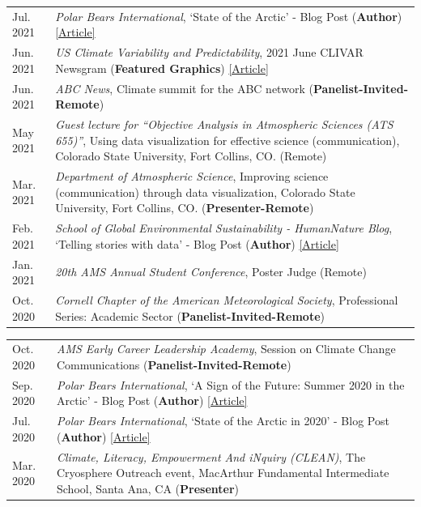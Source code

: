 \documentclass[margin,line,palatino,courier,10pt]{res}
\begin{document}
\begin{resume}
\begin{tabular}{@{}p{0.9in}p{4in}}
Jul. 2021 & \textit{Polar Bears International}, `State of the Arctic' - Blog Post (\textbf{Author}) \href{https://polarbearsinternational.org/news/article-climate-change/state-of-the-arctic/}{[Article]}\\
Jun. 2021 & \textit{US Climate Variability and Predictability}, 2021 June CLIVAR Newsgram (\textbf{Featured Graphics}) \href{https://mailchi.mp/usclivar/newsgram-2021june}{[Article]}\\
Jun. 2021 & \textit{ABC News}, Climate summit for the ABC network (\textbf{Panelist-Invited-Remote})\\
May 2021 & \textit{Guest lecture for ``Objective Analysis in Atmospheric Sciences (ATS 655)''}, Using data visualization for effective science (communication), Colorado State University, Fort Collins, CO. (Remote)\\
Mar. 2021 & \textit{Department of Atmospheric Science}, Improving science (communication) through data visualization, Colorado State University, Fort Collins, CO. (\textbf{Presenter-Remote})\\
Feb. 2021 & \textit{School of Global Environmental Sustainability - HumanNature Blog}, `Telling stories with data' - Blog Post (\textbf{Author}) \href{https://sustainability.colostate.edu/blog/humannature/zachary-labe/}{[Article]}\\
Jan. 2021 & \textit{20th AMS Annual Student Conference}, Poster Judge (Remote)\\
Oct. 2020 & \textit{Cornell Chapter of the American Meteorological Society}, Professional Series: Academic Sector (\textbf{Panelist-Invited-Remote})\\
\end{tabular}
\begin{tabular}{@{}p{0.9in}p{4in}}
Oct. 2020 & \textit{AMS Early Career Leadership Academy}, Session on Climate Change Communications (\textbf{Panelist-Invited-Remote})\\
Sep. 2020 & \textit{Polar Bears International}, `A Sign of the Future: Summer 2020 in the Arctic' - Blog Post (\textbf{Author}) \href{https://polarbearsinternational.org/news/article-climate-change/a-sign-of-the-future-summer-2020-in-the-arctic/}{[Article]}\\
Jul. 2020 & \textit{Polar Bears International}, `State of the Arctic in 2020' - Blog Post (\textbf{Author}) \href{https://polarbearsinternational.org/news/article-climate-change/state-of-the-arctic-in-2020/}{[Article]}\\
Mar. 2020 &\textit{Climate, Literacy, Empowerment And iNquiry (CLEAN)}, The Cryosphere Outreach event, MacArthur Fundamental Intermediate School, Santa Ana, CA (\textbf{Presenter})\\

\end{tabular}
\end{resume}
\end{document}
